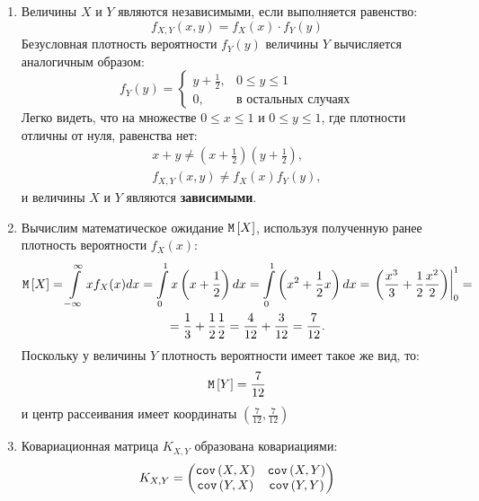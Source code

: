 \begin{enumerate}
    \item Величины $X$ и $Y$ являются независимыми, если выполняется равенство:
    \begin{equation}
        f_{X,Y}(x,y) = f_X(x) \cdot f_Y(y)
    \end{equation}
    Безусловная плотность вероятности $f_Y(y)$ величины $Y$ вычисляется аналогичным образом:
    \begin{equation}
        f_Y(y)
        =
        \left \{
        \begin{array}{ll}
            y + \frac{1}{2}, & 0 \le y \le 1              \\
            0,               & \text{в остальных случаях}
        \end{array}
        \right .
    \end{equation}
    Легко видеть, что на множестве $0 \le x \le 1$ и $0 \le y \le 1$, где плотности отличны от нуля, равенства нет:
    \begin{gather}
        x + y \neq \left ( x + \frac{1}{2} \right ) \left ( y + \frac{1}{2} \right ) , \\
        f_{X,Y}(x,y) \neq f_X(x) f_Y(y) ,
    \end{gather}
    и величины $X$ и $Y$ являются \textbf{зависимыми}.

    \item Вычислим математическое ожидание $\mathtt{M} \left [ X \right ]$, используя полученную ранее плотность вероятности $f_X(x)$:
    \begin{multline}
        \expectation{X}
        = \int \limits_{-\infty}^{\infty} x f_X(x) dx
        = \int \limits_0^1 x \left ( x + \frac{1}{2} \right ) dx
        = \int \limits_0^1 \left ( x^2 + \frac{1}{2} x \right ) dx
        = \left . \left ( \frac{x^3}{3} + \frac{1}{2} \frac{x^2}{2} \right ) \right |_0^1 = \\
%
        = \frac{1}{3} + \frac{1}{2} \frac{1}{2}
        = \frac{4}{12} + \frac{3}{12}
        = \frac{7}{12} .
    \end{multline}
    Поскольку у величины $Y$ плотность вероятности имеет такое же вид, то:
    \begin{equation}
        \mathtt{M} \left [ Y \right ] = \frac{7}{12}
    \end{equation}
    и центр рассеивания имеет координаты $\left ( \frac{7}{12}, \frac{7}{12} \right )$

    \item Ковариационная матрица $K_{X,Y}$ образована ковариациями:
    \begin{equation}
        K_{X,Y}
        = \begin{pmatrix}
              \texttt{cov} \left ( X , X \right ) & \texttt{cov} \left ( X , Y \right ) \\
              \texttt{cov} \left ( Y , X \right ) & \texttt{cov} \left ( Y , Y \right )
        \end{pmatrix}
    \end{equation}


\end{enumerate}
